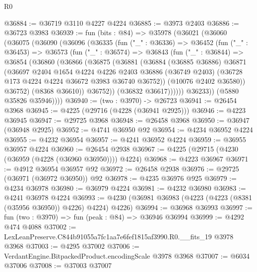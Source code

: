 \begin{lexlean}{R0}
\begin{coremodule}
@36884 := @36719 @3110 @4227 @4224
@36885 := @3973 @2403
@36886 := @36723 @3983
@36939 := fun (bits : @84) =>
  @35978
    (@36021
      (@36060
        (@36075
          (@36090
            (@36096
              (@36335
                (fun ("_" : @36336) =>
                @36452
                  (fun ("_" : @36453) =>
                  @36573
                    (fun ("_" : @36574) =>
                    @36843
                      (fun ("_" : @36844) =>
                      @36854
                        (@36860
                          (@36866
                            (@36875
                              (@36881
                                (@36884
                                  (@36885 @36886)
                                  @36871
                                  (@36697
                                    @2404
                                    @1654
                                    @4224
                                    @4226
                                    @2403
                                    @36886
                                    (@36749 @2403)
                                    (@36728 @173 @4224 @4224 @36672 @3983 @36740 @36752))
                                  (@10076 @2402 @36580))
                                @36752)
                              (@8368 @36610))
                            @36752))
                        (@36832 @36617))))))
              @36233))
          (@5880 @35826 @35946))))
@36940 := (two : @3970) -> @26723
@36941 := @26454 @3968
@36945 := @4225 (@29716 (@4228 (@36941 @2925)))
@36946 := @4223 @36945
@36947 := @29725 @3968
@36948 := @26458 @3968
@36950 := @36947 (@36948 @2925)
@36952 := @4741 @36950 @92
@36954 := @4234 @36952 @4224
@36955 := @4232 @36954
@36957 := @4241 @36952 @4224
@36959 := @36955 @36957 @4224
@36960 := @26454 @2938
@36967 := @4225 (@29715 (@4230 (@36959 (@4228 (@36960 @36950)))) @4224)
@36968 := @4223 @36967
@36971 := @4912 @36954 @36957 @92
@36972 := @26458 @2938
@36976 := @29725 (@36971 (@36972 @36950)) @92
@36978 := @4235 @36976 @925
@36979 := @4234 @36978
@36980 := @36979 @4224
@36981 := @4232 @36980
@36983 := @4241 @36978 @4224
@36993 := @4230 (@36981 @36983 (@4223 (@4223 (@8381 (@35956 @36950)) @4226) @4224) @4226)
@36994 := @36968 @36993
@36997 := fun (two : @3970) => fun (peak : @84) => @36946 @36994
@36999 := @4292 @474 @4088
@37002 := LexLeanPreserve.C844b91055a7fc1aa7e6fef1815af3990.R0.__fits_19 @3978 @3968
@37003 := @4295 @37002
@37006 := VerdantEngine.BitpackedProduct.encodingScale @3978 @3968
@37007 := @6034 @37006
@37008 := @37003 @37007

\end{coremodule}
\end{lexlean}
